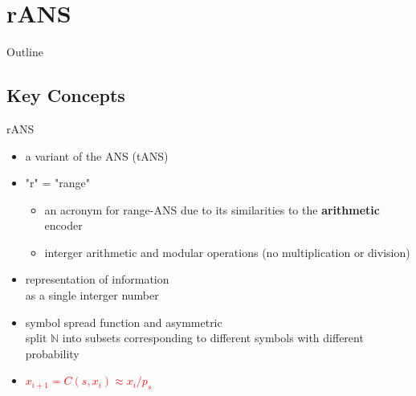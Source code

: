 \section{rANS}

\begin{frame}{Outline}
    \tableofcontents[
        currentsection, 
        sectionstyle=show/hide, 
        subsectionstyle=show/show/hide, 
        subsubsectionstyle=show/hide/show
    ]
\end{frame}

\subsection{Key Concepts}
    \begin{frame}[fragile]{rANS}
        \begin{itemize}
            \item<1-> a variant of the ANS (tANS)
            \item<2-> "r" = "range" 
            \begin{itemize}
                \item an acronym for range-ANS due to its similarities to the \textbf{arithmetic} encoder
                \item interger arithmetic and modular operations (no multiplication or division)
            \end{itemize}
            \item<3-> representation of information \\ as a single interger number
            \item<4-> symbol spread function and asymmetric \\ split $\mathbb{N}$ into subsets corresponding to different symbols with different probability
            \item<5-> \textcolor{red}{$\mathit{x_{i+1} = C(s,x_i) \approx x_i/p_s}$}
        \end{itemize}
    \end{frame}

